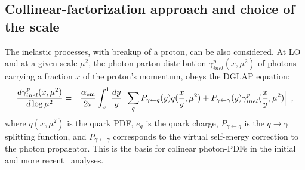 \subsection{Collinear-factorization approach and choice of the scale}

The inelastic processes, with breakup of a proton, can be also considered.
At LO and at a given scale $\mu^2$, the photon parton distribution $\gamma^p_{inel}(x,\mu^2)$ of photons carrying a fraction $x$ of the proton's momentum, obeys the DGLAP equation:
\begin{eqnarray}
{d \gamma^p_{inel}(x,\mu^2) \over d \log \mu^2} =&& {\alpha_{\rm{em}} \over 2 \pi} \int_x^1 {dy \over y} 
\Big [ \sum_q P_{\gamma \leftarrow q}(y) 
 q ({x \over y}, \mu^2 )   + P_{\gamma \leftarrow \gamma}(y) \gamma^p_{inel}({x \over y},\mu^2) \Big ]~,
\end{eqnarray}
where $q (x,\mu^2)$ is the quark PDF, $e_q$ is the quark charge, $P_{\gamma \leftarrow q}$ is the $q\rightarrow\gamma$ splitting function, and $P_{\gamma \leftarrow \gamma}$ corresponds to the virtual self-energy correction to the photon propagator.
This is the basis for colinear photon-PDFs in the initial~\cite{Gluck:2002fi, Martin:2004dh} and more recent~\cite{Ball:2013hta, Martin:2014nqa, Schmidt:2014aba, Harland-Lang:2016kog, Giuli:2017oii, Manohar:2016nzj, Bertone:2017bme} analyses.

